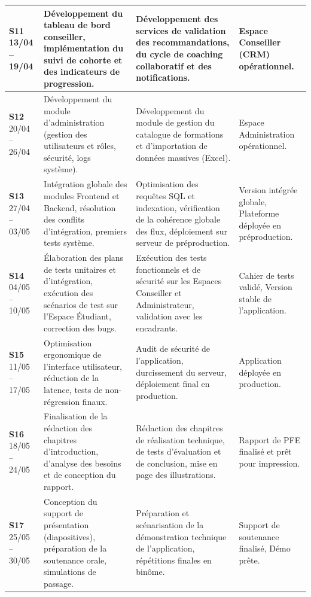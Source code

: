 \begin{longtable}{|p{1.5cm}|p{5.0cm}|p{5.0cm}|p{3.5cm}|}
\hline
\textbf{S11} \newline \scriptsize 13/04 -- 19/04 & Développement du tableau de bord conseiller, implémentation du suivi de cohorte et des indicateurs de progression. & Développement des services de validation des recommandations, du cycle de coaching collaboratif et des notifications. & Espace Conseiller (CRM) opérationnel. \\
\hline
\rowcolor{rowgray}
\textbf{S12} \newline \scriptsize 20/04 -- 26/04 & Développement du module d'administration (gestion des utilisateurs et rôles, sécurité, logs système). & Développement du module de gestion du catalogue de formations et d'importation de données massives (Excel). & Espace Administration opérationnel. \\
\hline
\textbf{S13} \newline \scriptsize 27/04 -- 03/05 & Intégration globale des modules Frontend et Backend, résolution des conflits d'intégration, premiers tests système. & Optimisation des requêtes SQL et indexation, vérification de la cohérence globale des flux, déploiement sur serveur de préproduction. & Version intégrée globale, Plateforme déployée en préproduction. \\
\hline
\rowcolor{rowgray}
\textbf{S14} \newline \scriptsize 04/05 -- 10/05 & Élaboration des plans de tests unitaires et d'intégration, exécution des scénarios de test sur l'Espace Étudiant, correction des bugs. & Exécution des tests fonctionnels et de sécurité sur les Espaces Conseiller et Administrateur, validation avec les encadrants. & Cahier de tests validé, Version stable de l'application. \\
\hline
\textbf{S15} \newline \scriptsize 11/05 -- 17/05 & Optimisation ergonomique de l'interface utilisateur, réduction de la latence, tests de non-régression finaux. & Audit de sécurité de l'application, durcissement du serveur, déploiement final en production. & Application déployée en production. \\
\hline
\rowcolor{rowgray}
\textbf{S16} \newline \scriptsize 18/05 -- 24/05 & Finalisation de la rédaction des chapitres d'introduction, d'analyse des besoins et de conception du rapport. & Rédaction des chapitres de réalisation technique, de tests d'évaluation et de conclusion, mise en page des illustrations. & Rapport de PFE finalisé et prêt pour impression. \\
\hline
\textbf{S17} \newline \scriptsize 25/05 -- 30/05 & Conception du support de présentation (diapositives), préparation de la soutenance orale, simulations de passage. & Préparation et scénarisation de la démonstration technique de l'application, répétitions finales en binôme. & Support de soutenance finalisé, Démo prête. \\
\hline
\end{longtable}
